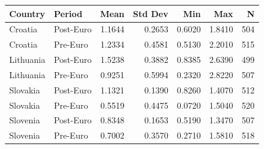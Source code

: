 \begin{tabular}{llrrrrr}
\hline
Country & Period & Mean & Std Dev & Min & Max & N \\
\hline
Croatia & Post-Euro & 1.1644 & 0.2653 & 0.6020 & 1.8410 & 504 \\
Croatia & Pre-Euro & 1.2334 & 0.4581 & 0.5130 & 2.2010 & 515 \\
Lithuania & Post-Euro & 1.5238 & 0.3882 & 0.8385 & 2.6390 & 499 \\
Lithuania & Pre-Euro & 0.9251 & 0.5994 & 0.2320 & 2.8220 & 507 \\
Slovakia & Post-Euro & 1.1321 & 0.1390 & 0.8260 & 1.4070 & 512 \\
Slovakia & Pre-Euro & 0.5519 & 0.4475 & 0.0720 & 1.5040 & 520 \\
Slovenia & Post-Euro & 0.8348 & 0.1653 & 0.5190 & 1.3470 & 507 \\
Slovenia & Pre-Euro & 0.7002 & 0.3570 & 0.2710 & 1.5810 & 518 \\
\hline
\end{tabular}
